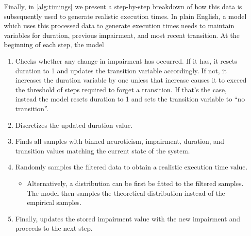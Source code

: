Finally, in \cref{alg:timings} we present a step-by-step breakdown of how this data is subsequently used to generate realistic execution times.
In plain English, a model which uses this processed data to generate execution times needs to maintain variables for duration, previous impairment, and most recent transition.
At the beginning of each step, the model
\begin{enumerate}
    \item Checks whether any change in impairment has occurred.
    If it has, it resets duration to \num{1} and updates the transition variable accordingly.
    If not, it increases the duration variable by one unless that increase causes it to exceed the threshold of steps required to forget a transition.
    If that's the case, instead the model resets duration to \num{1} and sets the transition variable to ``no transition''.
    \item Discretizes the updated duration value.
    \item Finds all samples with binned neuroticism, impairment, duration, and transition values matching the current state of the system.
    \item Randomly samples the filtered data to obtain a realistic execution time value.
    \begin{itemize}
        \item Alternatively, a distribution can be first be fitted to the filtered samples.
        The model then samples the theoretical distribution instead of the empirical samples.
    \end{itemize}
    \item Finally, updates the stored impairment value with the new impairment and proceeds to the next step.
\end{enumerate}

